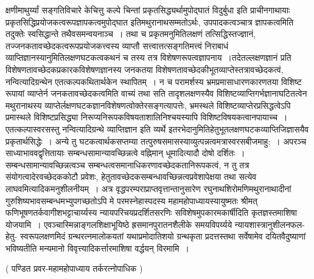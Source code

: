 \documentclass[10pt, openany]{book}
\begin{document}
\newpage
\noindent
क्षणीमाथुर्य्यां सङ्गतिविचारे केचित्तु कल्पे चिन्तां प्रकृतसिद्ध्यर्थामुपोद्घातं विदुर्बुधा इति प्राचीनगाथायाः प्रकृतसिद्धिप्रयोजकत्वरूपज्ञापकत्वमुपोद्घात इतिमथुरानाथसम्मतोऽर्थः, उपपादकत्वञ्चात्र ज्ञापकत्वमिति तदुक्तेः स्वसिद्धान्ते तथैवसमन्वयनाञ्च~। तथा च प्रकृतमनुमितिलक्षणं तत्सिद्धिस्तज्ज्ञानं, तज्जनकतावच्छेदकत्वरूपप्रयोजकत्त्वस्य व्याप्तौ सत्त्वात्तत्सङ्गतिमत्त्वं निराबाधं व्याप्तिज्ञानस्यानुमितिलक्षणघटकत्वकथनं च तस्य तत्र विशेषणरूपत्वज्ञापनाय~।तदेतल्लक्षणज्ञानं प्रति विशेषणतावच्छेदकप्रकारकविशेषणज्ञानस्य जनकतया विशेषणतावच्छेदकीभूतव्याप्तेस्तत्रावच्छेदकत्वं, नन्वित्यादिग्रन्थेन एतत्कल्पकथितार्थकेन
स्थापितम्~। न च परामर्शस्य भ्रमप्रमासाधारणकारणतया विशिष्ट  रूपायां व्याप्तेर्न जनकतावच्छेदकत्वमिति वाच्यं तथा सति तादृशलक्षणस्यैव विशिष्टव्याप्तिगर्भज्ञानाघटितत्वेन मथुरानाथस्य व्याप्तेर्लक्षणघटकज्ञानविशेषणत्वोक्तेरसङ्गत्यापत्तेः, भ्रमस्थले विशिष्टव्याप्तेरप्रसिद्धत्वेऽपि प्रमास्थले विशिष्टप्रसिद्ध्या निरूप्यनिरूपकविषयताशालिनिश्चयस्यापि विशिष्टविषयकत्वानपायाच्च~।एतत्कल्पास्वरसस्तु नन्वित्यादिग्रन्थे व्याप्तिज्ञान इति व्यर्थे इतरभेदानुमितिहेतुभूतलक्षणघटकव्याप्तिजिज्ञासयैव प्रकृतार्थसिद्धेः~। अन्ये तु घटकत्वार्थकसप्तम्या तत्पुरुषसमासस्याव्युत्पन्नत्वमत्रास्वरसबीजमाहु:~। अपरञ्च साध्याभाववद्वृत्तितायाः सम्बन्धसामान्यावच्छिन्नत्वे वह्निमान् धूमादित्यादौ दोषो दर्शितः~। सम्बन्धसामान्यावच्छिन्नत्वञ्च सम्बन्धत्वसमानाधिकरणावच्छेदकतानिरूपकत्वं, न तु तत्र संयोगत्वादेरवच्छेदककोटौ प्रवेशः, हेतुतावच्छेदकसम्बन्धावच्छिन्नत्वप्रवेशापेक्षया तथा सत्येव लाघवमित्यादिकमनुशीलनीयम्~। अत्र वृद्धपरम्पराप्राप्तवृत्तान्तानुसारेण
रघुनाथशिरोमणिमथुरानाथादीनां गुरुशिष्यभावसम्बन्धमभ्युपगच्छतोऽपि मे परमस्नेहास्पदस्य महामहोपाध्यायस्यायुष्मतः श्रीमत् फणिभूषणतर्कवागीशभट्टाचार्य्यस्य न्यायपरिचयप्रदर्शितसरणिः सविशेषमुपकारमकार्षीदिति कृतज्ञस्तमाशिषा योजयामि~। एवञ्चास्मिन्नाङ्गलशिक्षाभूयिष्ठे {\qt ह्रसमानपुरातनशैलीके} समयविपर्य्यये
न्यायशास्त्रानुशीलनफल- हेतु- स्वरूपलक्षणमिदं ग्रन्थरत्नमालोकयतां यथाप्रमोदातिशयो ग्रन्थकृता प्रदत्तस्तथा सर्वेषामेव दयितवैदुष्याणां भविष्यतीति मन्यमानो
विवृत्त्यादिकर्त्तारमाशिषा वर्द्धयन् विरमामि~।
\begin{center}
( पण्डित प्रवर-महामहोपाध्याय तर्करत्नोपाधिक )
\end{center}
\end{document}

